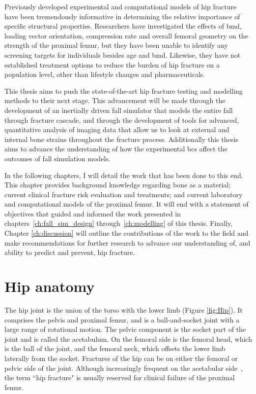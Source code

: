 Previously developed experimental and computational models of hip fracture have been tremendously informative in determining the relative importance of specific structural properties.
Researchers have investigated the effects of \ac{bmd}, loading vector orientation, compression rate and overall femoral geometry on the strength of the proximal femur, but they have been unable to identify any screening targets for individuals besides age and \ac{bmd}.
Likewise, they have not established treatment options to reduce the burden of hip fracture on a population level, other than lifestyle changes and pharmaceuticals.

This thesis aims to push the state-of-the-art hip fracture testing and modelling methods to their next stage.
This advancement will be made through the development of an inertially driven fall simulator that models the entire fall through fracture cascade, and through the development of tools for advanced, quantitative analysis of imaging data that allow us to look at external and internal bone strains throughout the fracture process.
Additionally this thesis aims to advance the understanding of how the experimental \aclp*{bc} affect the outcomes of fall simulation models.

In the following chapters, I will detail the work that has been done to this end.
This chapter provides background knowledge regarding bone as a material; current clinical fracture risk evaluation and treatments; and current laboratory and computational models of the proximal femur.
It will end with a statement of objectives that guided and informed the work presented in chapters~\ref{ch:fall_sim_design} through~\ref{ch:modelling} of this thesis. 
Finally, Chapter \ref{ch:discussion} will outline the contributions of the work to the field and make recommendations for further research to advance our understanding of, and ability to predict and prevent, hip fracture.

\section{Hip anatomy}
\label{sec:intro_hipAnat}
The hip joint is the union of the torso with the lower limb (Figure \ref{fig:Hip}).
It comprises the pelvis and proximal femur, and is a ball-and-socket joint with a large range of rotational motion.
The pelvic component is the socket part of the joint and is called the acetabulum.
On the femoral side is the femoral head, which is the ball of the joint, and the femoral neck, which offsets the lower limb laterally from the socket.
Fractures of the hip can be on either the femoral or pelvic side of the joint.
Although increasingly frequent on the acetabular side~\citep{ferguson_fractures_2010}, the term ``hip fracture" is usually reserved for clinical failure of the proximal femur.

